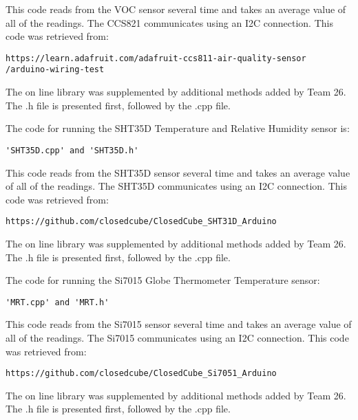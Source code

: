 \documentclass[12pt,letterpaper,titlepage]{article}
\begin{document}
This code reads from the VOC sensor several time and takes an average value of all of the readings. The CCS821 communicates using an I2C connection. This code was retrieved from:
\begin{verbatim}
https://learn.adafruit.com/adafruit-ccs811-air-quality-sensor
/arduino-wiring-test
\end{verbatim}
The on line library was supplemented by additional methods added by Team 26. The .h file is presented first, followed by the .cpp file.


The code for running the SHT35D Temperature and Relative Humidity sensor is:
\begin{verbatim}
'SHT35D.cpp' and 'SHT35D.h'
\end{verbatim}
This code reads from the SHT35D sensor several time and takes an average value of all of the readings. The SHT35D communicates using an I2C connection. This code was retrieved from:
\begin{verbatim}
https://github.com/closedcube/ClosedCube_SHT31D_Arduino
\end{verbatim}
The on line library was supplemented by additional methods added by Team 26. The .h file is presented first, followed by the .cpp file.


The code for running the Si7015 Globe Thermometer Temperature sensor:
\begin{verbatim}
'MRT.cpp' and 'MRT.h'
\end{verbatim}
This code reads from the Si7015 sensor several time and takes an average value of all of the readings. The Si7015 communicates using an I2C connection. This code was retrieved from:
\begin{verbatim}
https://github.com/closedcube/ClosedCube_Si7051_Arduino
\end{verbatim}
The on line library was supplemented by additional methods added by Team 26. The .h file is presented first, followed by the .cpp file.


\end{document}
